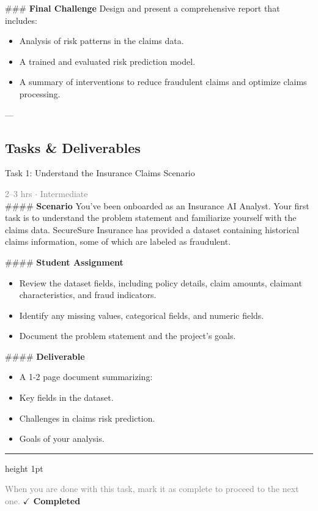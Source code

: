 \documentclass[10pt,a4paper]{article}
\begin{document}
\#\#\# \textbf{Final Challenge}
Design and present a comprehensive report that includes:
\begin{itemize}
    \item Analysis of risk patterns in the claims data.
    \item A trained and evaluated risk prediction model.
    \item A summary of interventions to reduce fraudulent claims and optimize claims processing.
\end{itemize}

---

\subsection*{Tasks \& Deliverables}

\begin{taskbox}{Task 1: Understand the Insurance Claims Scenario}

    {\small \textcolor{gray}{2--3 hrs $\cdot$ Intermediate}}\\[12pt]

    \#\#\#\# \textbf{Scenario} 
You’ve been onboarded as an Insurance AI Analyst. Your first task is to understand the problem statement and familiarize yourself with the claims data. SecureSure Insurance has provided a dataset containing historical claims information, some of which are labeled as fraudulent. 

\#\#\#\# \textbf{Student Assignment}
\begin{itemize}
    \item Review the dataset fields, including policy details, claim amounts, claimant characteristics, and fraud indicators.
    \item Identify any missing values, categorical fields, and numeric fields.
    \item Document the problem statement and the project’s goals.
\end{itemize}

\#\#\#\# \textbf{Deliverable}
\begin{itemize}
    \item A 1-2 page document summarizing:
    \item Key fields in the dataset.
    \item Challenges in claims risk prediction.
    \item Goals of your analysis.\par
\end{itemize}

    \vspace{16pt}

    \textcolor{cardBorder}{\hrule height 1pt}\vspace{8pt}

    \small \textcolor{gray}{When you are done with this task, mark it as complete to proceed to the next one.} \hfill \textbf{\textcolor{brandDark}{$\checkmark$ Completed}}

\end{taskbox}
\end{document}
